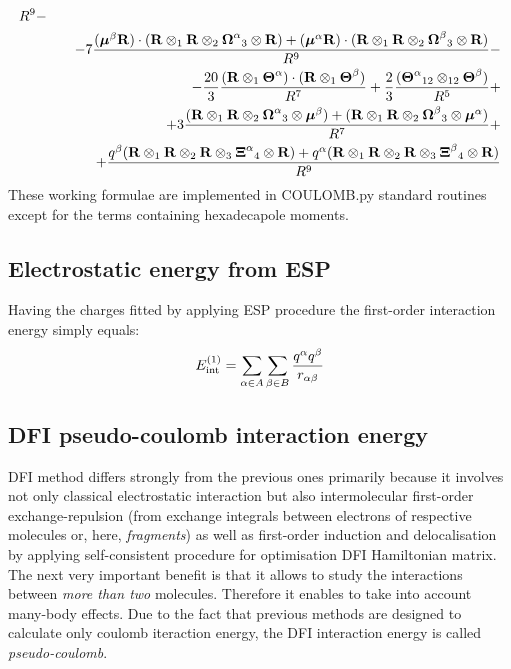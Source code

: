 \documentclass[a4paper,titlepage,twoside,fleqn]{article}
\newcommand{\BM}[1]{\ensuremath{\mbox{\boldmath${#1}$}}}
\begin{document}
\begin{eqnarray}
{ }{R^9} - \\ \nonumber
&&\quad-
7\frac{
({\BM\mu^{\beta}}{\bf R}) \cdot ({\bf R}\otimes_1{\bf R}\otimes_2{\BM\Omega}^{\alpha}{}_3\otimes{\bf R}) +
({\BM\mu^{\alpha}}{\bf R}) \cdot ({\bf R}\otimes_1{\bf R}\otimes_2{\BM\Omega}^{\beta}{}_3\otimes{\bf R})
}{R^9} - \\ \nonumber
&&\quad-
\frac{20}{3}
\frac{
({\bf R}\otimes_1{\BM\Theta}^{\alpha})\cdot({\bf R}\otimes_1{\BM\Theta}^{\beta})
}{R^7} +
\frac{2}{3}
\frac{({\BM\Theta}^{\alpha}{}_{12}\otimes_{12}{\BM\Theta}^{\beta})}{R^5} + \\ \nonumber
&&\quad+
3\frac{
({\bf R}\otimes_1{\bf R}\otimes_2{\BM\Omega}^{\alpha}{}_3\otimes{\BM \mu^{\beta}})+
({\bf R}\otimes_1{\bf R}\otimes_2{\BM\Omega}^{\beta}{}_3\otimes{\BM \mu^{\alpha}})
}{R^7} + \\ \nonumber
&&\quad+
\frac{
q^{\beta} ({\bf R}\otimes_1{\bf R}\otimes_2{\bf R}\otimes_3{\BM\Xi}^{\alpha}{}_4\otimes{\bf R}) +
q^{\alpha} ({\bf R}\otimes_1{\bf R}\otimes_2{\bf R}\otimes_3{\BM\Xi}^{\beta}{}_4\otimes{\bf R})  
}{R^9}
\end{eqnarray}
%
These working formulae are implemented in {\sc COULOMB.py} 
standard routines except for the terms containing 
hexadecapole moments. 

\subsection{Electrostatic energy from ESP}

Having the charges fitted by applying ESP procedure the first-order
interaction energy simply equals:
\begin{equation}
E_{\rm int}^{(1)} = \sum_{\alpha\in A}\sum_{\beta\in B}\frac{q^{\alpha}q^{\beta}}{r_{\alpha\beta}}
\end{equation}  

\subsection{DFI pseudo-coulomb interaction energy}

DFI method differs strongly from the previous ones primarily 
because it involves not only classical electrostatic interaction 
but also intermolecular first-order exchange-repulsion (from
exchange integrals between electrons of respective molecules 
or, here, \emph{fragments}) as well as first-order induction
and delocalisation by applying self-consistent procedure for 
optimisation DFI Hamiltonian matrix. The next very important
benefit is that it allows to study the interactions between 
\emph{more than two} molecules. Therefore it enables to take into 
account many-body effects. Due to the fact that previous methods 
are designed to calculate only coulomb iteraction energy, the 
DFI interaction energy is called \emph{pseudo-coulomb}.
\end{document}
